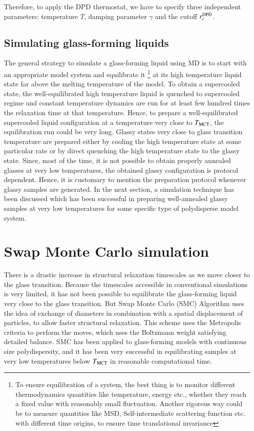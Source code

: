     Therefore, to apply the DPD thermostat, we have to specify three independent parameters: temperature $T$, damping parameter $\gamma$ and the cutoff $r_c^{\rm DPD}$.
    
    \subsection{Simulating glass-forming liquids}
    
    The general strategy to simulate a glass-forming liquid using MD \cite{binder2011glassy,hansen2013} is to start with an appropriate model system and equilibrate it \footnote{To ensure equilibration of a system, the best thing is to monitor different thermodynamics quantities like temperature, energy etc., whether they reach a fixed value with reasonably small fluctuation. Another rigorous way could be to measure quantities like MSD, Self-intermediate scattering function etc. with different time origins, to ensure time translational invariance} at its high temperature liquid state far above the melting temperature of the model. To obtain a supercooled state, the well-equilibrated high temperature liquid is quenched to supercooled regime and constant temperature dynamics are run for at least few hundred times the relaxation time at that temperature. Hence, to prepare a well-equilibrated supercooled liquid configuration at a temperature very close to $T_{\rm MCT}$, the equilibration run could be very long. Glassy states very close to glass transition temperature are prepared either by cooling the high temperature state at some particular rate or by direct quenching the high temperature state to the glassy state. Since, most of the time, it is not possible to obtain properly annealed glasses at very low temperatures, the obtained glassy configuration is protocol dependent. Hence, it is customary to mention the preparation protocol whenever glassy samples are generated. In the next section, a simulation technique has been discussed which has been successful in preparing well-annealed glassy samples at very low temperatures for some specific type of polydisperse model system.
    
\section{Swap Monte Carlo simulation}\label{swap}
There is a drastic increase in structural relaxation timescales as we move closer to the glass transition. Because the timescales accessible in conventional simulations is very limited, it has not been possible to equilibrate the glass-forming liquid very close to the glass transition. But Swap Monte Carlo (SMC) Algorithm \cite{ninarello2017models} uses the idea of exchange of diameters in combination with a spatial displacement of particles, to allow faster structural relaxation. This scheme uses the Metropolis criteria to perform the moves, which uses the Boltzmann weight satisfying detailed balance. SMC has been applied to glass-forming models with continuous size polydispersity, and it has been very successful in equilibrating samples at very low temperatures below $T_{\rm MCT}$ in reasonable computational time.
    
